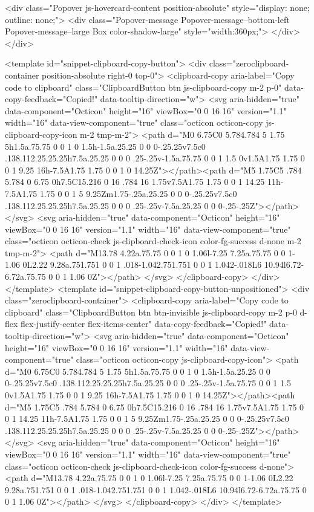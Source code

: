 {{{{{{{    <div class="Popover js-hovercard-content position-absolute" style="display: none; outline: none;">
  <div class="Popover-message Popover-message--bottom-left Popover-message--large Box color-shadow-large" style="width:360px;">
  </div>
</div>

    <template id="snippet-clipboard-copy-button">
  <div class="zeroclipboard-container position-absolute right-0 top-0">
    <clipboard-copy aria-label="Copy code to clipboard" class="ClipboardButton btn js-clipboard-copy m-2 p-0" data-copy-feedback="Copied!" data-tooltip-direction="w">
      <svg aria-hidden="true" data-component="Octicon" height="16" viewBox="0 0 16 16" version="1.1" width="16" data-view-component="true" class="octicon octicon-copy js-clipboard-copy-icon m-2 tmp-m-2">
    <path d="M0 6.75C0 5.784.784 5 1.75 5h1.5a.75.75 0 0 1 0 1.5h-1.5a.25.25 0 0 0-.25.25v7.5c0 .138.112.25.25.25h7.5a.25.25 0 0 0 .25-.25v-1.5a.75.75 0 0 1 1.5 0v1.5A1.75 1.75 0 0 1 9.25 16h-7.5A1.75 1.75 0 0 1 0 14.25Z"></path><path d="M5 1.75C5 .784 5.784 0 6.75 0h7.5C15.216 0 16 .784 16 1.75v7.5A1.75 1.75 0 0 1 14.25 11h-7.5A1.75 1.75 0 0 1 5 9.25Zm1.75-.25a.25.25 0 0 0-.25.25v7.5c0 .138.112.25.25.25h7.5a.25.25 0 0 0 .25-.25v-7.5a.25.25 0 0 0-.25-.25Z"></path>
</svg>
      <svg aria-hidden="true" data-component="Octicon" height="16" viewBox="0 0 16 16" version="1.1" width="16" data-view-component="true" class="octicon octicon-check js-clipboard-check-icon color-fg-success d-none m-2 tmp-m-2">
    <path d="M13.78 4.22a.75.75 0 0 1 0 1.06l-7.25 7.25a.75.75 0 0 1-1.06 0L2.22 9.28a.751.751 0 0 1 .018-1.042.751.751 0 0 1 1.042-.018L6 10.94l6.72-6.72a.75.75 0 0 1 1.06 0Z"></path>
</svg>
    </clipboard-copy>
  </div>
</template>
<template id="snippet-clipboard-copy-button-unpositioned">
  <div class="zeroclipboard-container">
    <clipboard-copy aria-label="Copy code to clipboard" class="ClipboardButton btn btn-invisible js-clipboard-copy m-2 p-0 d-flex flex-justify-center flex-items-center" data-copy-feedback="Copied!" data-tooltip-direction="w">
      <svg aria-hidden="true" data-component="Octicon" height="16" viewBox="0 0 16 16" version="1.1" width="16" data-view-component="true" class="octicon octicon-copy js-clipboard-copy-icon">
    <path d="M0 6.75C0 5.784.784 5 1.75 5h1.5a.75.75 0 0 1 0 1.5h-1.5a.25.25 0 0 0-.25.25v7.5c0 .138.112.25.25.25h7.5a.25.25 0 0 0 .25-.25v-1.5a.75.75 0 0 1 1.5 0v1.5A1.75 1.75 0 0 1 9.25 16h-7.5A1.75 1.75 0 0 1 0 14.25Z"></path><path d="M5 1.75C5 .784 5.784 0 6.75 0h7.5C15.216 0 16 .784 16 1.75v7.5A1.75 1.75 0 0 1 14.25 11h-7.5A1.75 1.75 0 0 1 5 9.25Zm1.75-.25a.25.25 0 0 0-.25.25v7.5c0 .138.112.25.25.25h7.5a.25.25 0 0 0 .25-.25v-7.5a.25.25 0 0 0-.25-.25Z"></path>
</svg>
      <svg aria-hidden="true" data-component="Octicon" height="16" viewBox="0 0 16 16" version="1.1" width="16" data-view-component="true" class="octicon octicon-check js-clipboard-check-icon color-fg-success d-none">
    <path d="M13.78 4.22a.75.75 0 0 1 0 1.06l-7.25 7.25a.75.75 0 0 1-1.06 0L2.22 9.28a.751.751 0 0 1 .018-1.042.751.751 0 0 1 1.042-.018L6 10.94l6.72-6.72a.75.75 0 0 1 1.06 0Z"></path>
</svg>
    </clipboard-copy>
  </div>
</template>


}}}}}}}
